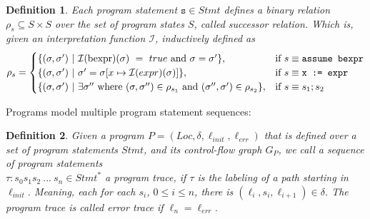 \documentclass{article}
\newcommand{\Stmt}{\ensuremath{\mathit{Stmt}}\xspace}
\newcommand{\Loc}{\ensuremath{\mathit{Loc}}\xspace}
\newcommand{\err}{\ensuremath{\mathit{err}}\xspace}
\newcommand{\init}{\ensuremath{\mathit{init}}\xspace}
\newtheorem{mydef}{Definition}
\newcommand\mycom[1]{}
\newcommand\mycom[1]{#1}
\newcommand{\ts}[1]{\mycom{\todo[color=green!40,inline]{\small TS: #1}}}
\begin{document}
\begin{mydef}
    Each program statement $\texttt{s} \in \Stmt$ defines a binary relation $\rho_s \subseteq S \times S$ over the set of program states $S$, called successor relation. Which is, given an interpretation function $\mathcal{I}$, inductively defined as
$$ \rho_s =
\begin{cases}
    \{(\sigma, \sigma')\ |\ \mathcal{I}(\text{bexpr})(\sigma)\ =\ true\ \text{and}\ \sigma = \sigma'\} , & \text{if}\ s \equiv \text{\texttt{assume bexpr}} \\
    \{(\sigma, \sigma')\ |\ \sigma' = \sigma[x \mapsto \mathcal{I}(expr)(\sigma)]\} , & \text{if}\ s \equiv \texttt{x := expr} \\
    \{(\sigma, \sigma')\ |\ \exists \sigma''\ \text{where}\ (\sigma, \sigma'') \in \rho_{s_1}\ \text{and}\ (\sigma'', \sigma') \in \rho_{s_2} \}, & \text{if}\ s \equiv \texttt{$s_1;s_2$}
\end{cases}
$$\ts{You already used $\rho$ for valuation.}
\ts{What is an interpretation function?}
\end{mydef}

Programs model multiple program statement sequences:
\begin{mydef}
Given a program $P = (\Loc, \delta, \ell_\init, \ell_\err)$ that is defined over a set of program statements \Stmt, and its control-flow graph $G_P$, we call a sequence of program statements \\ $\tau: s_0 s_1 s_2\ ...\ s_n \in \Stmt^*$ a program trace, if $\tau$ is the labeling of a path starting in $\ell_\init$. Meaning, each for each $s_i$, $0 \leq i \leq n$, there is $(\ell_i, s_i, \ell_{i+1}) \in \delta$. The program trace is called error trace if $\ell_n = \ell_\err$.  
\end{mydef}
\end{document}
